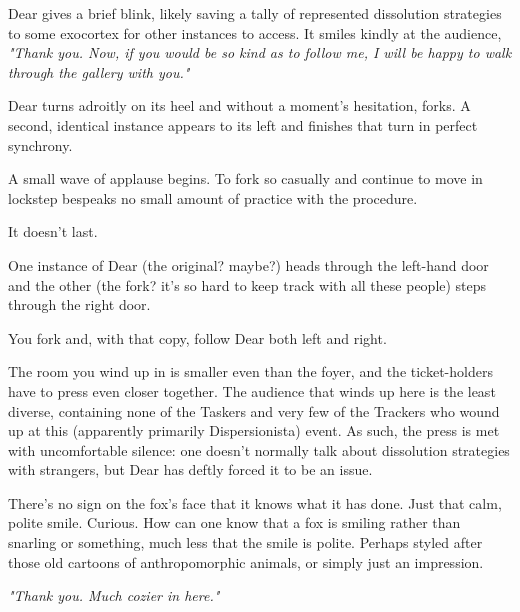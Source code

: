 Dear gives a brief blink, likely saving a tally of represented dissolution strategies to some exocortex for other instances to access. It smiles kindly at the audience, \emph{"Thank you. Now, if you would be so kind as to follow me, I will be happy to walk through the gallery with you."}

Dear turns adroitly on its heel and without a moment's hesitation, forks. A second, identical instance appears to its left and finishes that turn in perfect synchrony.

\newpage

\null
\vfill

A small wave of applause begins. To fork so casually and continue to move in lockstep bespeaks no small amount of practice with the procedure.

\vfill

It doesn't last.

\vfill

\newpage

\null
\vfill

One instance of Dear (the original? maybe?) heads through the left-hand door and the other (the fork? it's so hard to keep track with all these people) steps through the right door.

\vfill

You fork and, with that copy, follow Dear both left\textsuperscript{\pageref{left-door}} and right\textsuperscript{\pageref{right-door}}.

\vfill

\newpage

\label{left-door}

The room you wind up in is smaller even than the foyer, and the ticket-holders have to press even closer together. The audience that winds up here is the least diverse, containing none of the Taskers and very few of the Trackers who wound up at this (apparently primarily Dispersionista) event. As such, the press is met with uncomfortable silence: one doesn't normally talk about dissolution strategies with strangers, but Dear has deftly forced it to be an issue.

There's no sign on the fox's face that it knows what it has done. Just that calm, polite smile. Curious. How can one know that a fox is smiling rather than snarling or something, much less that the smile is polite. Perhaps styled after those old cartoons of anthropomorphic animals, or simply just an impression.

\emph{"Thank you. Much cozier in here."}

